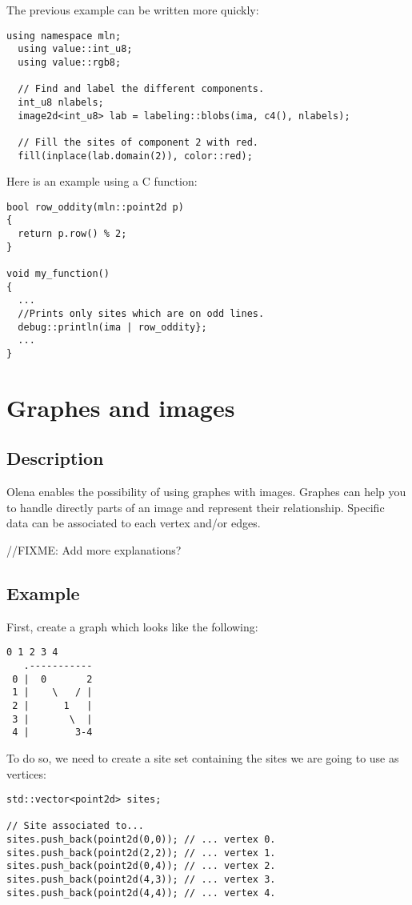 \documentclass{report}
\begin{document}
The previous example can be written more quickly:
\begin{lstlisting}[frame=single]
  using namespace mln;
  using value::int_u8;
  using value::rgb8;

  // Find and label the different components.
  int_u8 nlabels;
  image2d<int_u8> lab = labeling::blobs(ima, c4(), nlabels);

  // Fill the sites of component 2 with red.
  fill(inplace(lab.domain(2)), color::red);
\end{lstlisting}

Here is an example using a C function:
\begin{lstlisting}[frame=single]
bool row_oddity(mln::point2d p)
{
  return p.row() % 2;
}

void my_function()
{
  ...
  //Prints only sites which are on odd lines.
  debug::println(ima | row_oddity};
  ...
}
\end{lstlisting}


\chapter{Graphes and images}
\section{Description}
Olena enables the possibility of using graphes with images.
Graphes can help you to handle directly parts of an image and represent their
relationship.
Specific data can be associated to each vertex and/or edges.

//FIXME: Add more explanations?

\section{Example}

First, create a graph which looks like the following:

\begin{lstlisting}[frame=single]
      0 1 2 3 4
   .-----------
 0 |  0       2
 1 |    \   / |
 2 |      1   |
 3 |       \  |
 4 |        3-4
\end{lstlisting}

To do so, we need to create a site set containing the sites we are going to use
as vertices:

\begin{lstlisting}
std::vector<point2d> sites;

// Site associated to...
sites.push_back(point2d(0,0)); // ... vertex 0.
sites.push_back(point2d(2,2)); // ... vertex 1.
sites.push_back(point2d(0,4)); // ... vertex 2.
sites.push_back(point2d(4,3)); // ... vertex 3.
sites.push_back(point2d(4,4)); // ... vertex 4.
\end{lstlisting}
\end{document}

